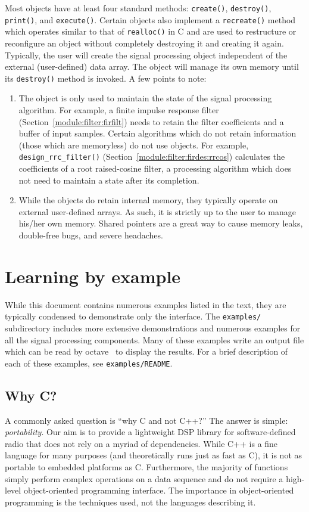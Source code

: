 Most objects have at least four standard methods:
{\tt create()},
{\tt destroy()},
{\tt print()},
and
{\tt execute()}.
Certain objects also implement a {\tt recreate()} method which operates
similar to that of {\tt realloc()} in C and are used to restructure or
reconfigure an object without completely destroying it and creating it again.
Typically, the user will create the signal processing object independent of
the external (user-defined) data array.
The object will manage its own memory until its {\tt destroy()} method is
invoked.
A few points to note:
\begin{enumerate}
\item The object is only used to maintain the state of the signal processing
      algorithm.
      For example, a finite impulse response filter
      (Section~\ref{module:filter:firfilt}) needs to retain the filter
      coefficients and a buffer of input samples.
      Certain algorithms which do not retain information (those which are
      memoryless) do not use objects.
      For example, {\tt design\_rrc\_filter()}
      (Section~\ref{module:filter:firdes:rrcos})
      calculates the coefficients of a root raised-cosine filter, a processing
      algorithm which does not need to maintain a state after its completion.
\item While the objects do retain internal memory, they typically operate on
      external user-defined arrays.
      As such, it is strictly up to the user to manage his/her own memory.
      Shared pointers are a great way to cause memory leaks, double-free bugs,
      and severe headaches.
\end{enumerate}

\section{Learning by example}
While this document contains numerous examples listed in the text, they are
typically condensed to demonstrate only the interface.
The {\tt examples/} subdirectory includes more extensive demonstrations and
numerous examples for all the signal processing components.
Many of these examples write an output file which can be read by
octave~\cite{octave:web} to display the results.
For a brief description of each of these examples, see {\tt examples/README}.

\subsection{Why C?}
A commonly asked question is ``why C and not C++?''
The answer is simple: {\em portability}.
Our aim is to provide a lightweight DSP library for software-defined radio
that does not rely on a myriad of dependencies.
While C++ is a fine language for many purposes (and theoretically runs just as
fast as C), it is not as portable to embedded platforms as C.
Furthermore, the majority of functions simply perform complex operations on a
data sequence and do not require a high-level object-oriented programming
interface.
The importance in object-oriented programming is the techniques used, not the
languages describing it.

